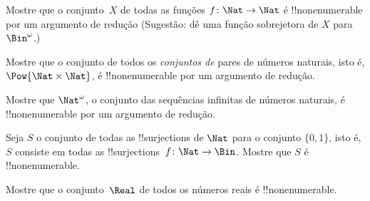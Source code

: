 \documentclass[../../../include/open-logic-section]{subfiles}
\begin{document}
\begin{prob}\label{sfr:siz:red:prob:nat-nat}
  Mostre que o conjunto~$X$ de todas as funções $f\colon \Nat \to \Nat$ é
  !!{nonenumerable} por um argumento de redução (Sugestão: dê uma função
  sobrejetora de $X$ para~$\Bin^\omega$.)
\end{prob}

\begin{prob}
Mostre que o conjunto de todos os \emph{conjuntos de} pares de números naturais,
isto é, $\Pow{\Nat \times \Nat}$, é !!{nonenumerable} por um argumento de redução.
\end{prob}

\begin{prob}
Mostre que $\Nat^\omega$, o conjunto das sequências infinitas de números
naturais, é !!{nonenumerable} por um argumento de redução.
\end{prob}


\begin{prob}
Seja $S$ o conjunto de todas as !!{surjection}s de $\Nat$ para o conjunto
$\{0,1\}$, isto é, $S$ consiste em todas as !!{surjection}s~$f \colon \Nat \to
\Bin$. Mostre que $S$ é !!{nonenumerable}.
\end{prob}

\begin{prob}
Mostre que o conjunto~$\Real$ de todos os números reais é !!{nonenumerable}.
\end{prob}
\end{document}

